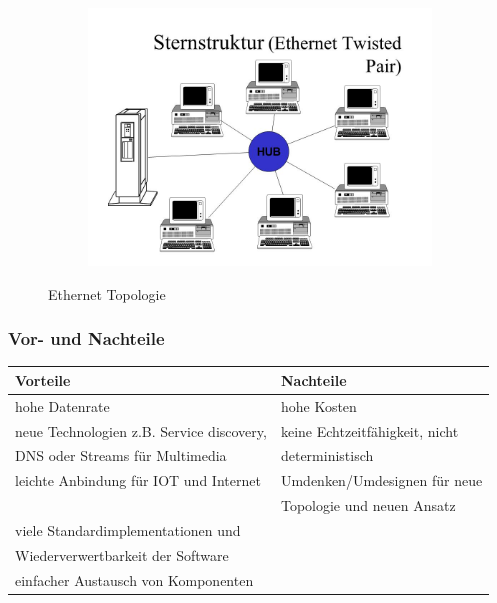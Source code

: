 \begin{figure}[h!]
\begin{subfigure}[b]{0.4\textwidth}
            \includegraphics[width=\linewidth]{stern_topology.jpg}
            \label{fig:MH03}
        \end{subfigure}
        \caption{Ethernet Topologie}
    \end{figure}
    
    \subsubsection{Vor- und Nachteile}
    \begin{center}
    \begin{tabular}{l|l}
        \textbf{Vorteile} & \textbf{Nachteile}\\
        \hline hohe Datenrate & hohe Kosten\\
        \hline neue Technologien z.B. Service discovery,  & keine Echtzeitfähigkeit, nicht\\
        DNS oder Streams für Multimedia & deterministisch\\
        \hline leichte Anbindung für IOT und Internet & Umdenken/Umdesignen für neue \\
        & Topologie und neuen Ansatz\\
        \hline viele Standardimplementationen und&\\
        Wiederverwertbarkeit der Software&\\
        \hline einfacher Austausch von Komponenten &\\
    \end{tabular}
\end{center}
    

